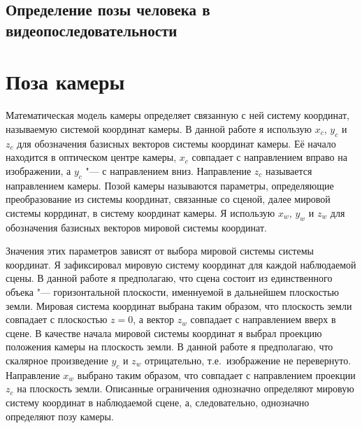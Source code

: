 \subsection{Определение позы человека в видеопоследовательности}

\def\slantfrac#1#2{ \hspace{3pt}\!^{#1}\!\!\hspace{1pt}/
	\hspace{2pt}\!\!_{#2}\!\hspace{3pt}
} %

\iffalse
\chapter{Определение позы камеры в сцене} \label{chapt1}
\fi

\section{Поза камеры}
Математическая модель камеры определяет связанную с ней систему координат, называемую системой координат камеры. В данной работе я использую $x_c$, $y_c$ и $z_c$ для обозначения базисных векторов системы координат камеры. Её начало находится в оптическом центре камеры, $x_c$ совпадает с направлением вправо на изображении, а $y_c$ "--- с направлением вниз. Направление $z_c$ называется направлением камеры. Позой камеры называются параметры, определяющие преобразование из системы координат, связанные со сценой, далее мировой системы коррдинат, в систему координат камеры. Я использую $x_w$, $y_w$ и $z_w$ для обозначения базисных векторов мировой системы координат.

Значения этих параметров зависят от выбора мировой системы системы координат. Я зафиксировал мировую систему координат для каждой наблюдаемой сцены. В данной работе я предполагаю, что сцена состоит из единственного объека "--- горизонтальной плоскости, именнуемой в дальнейшем плоскостью земли. Мировая система координат выбрана таким образом, что плоскость земли совпадает с плоскостью $z=0$, а вектор $z_w$ совпадает с направлением вверх в сцене. В качестве начала мировой системы координат я выбрал проекцию положения камеры на плоскость земли. В данной работе я предполагаю, что скалярное произведение $y_c$ и $z_w$ отрицательно, т.е.~изображение не перевернуто. Направление $x_w$ выбрано таким образом, что совпадает с направлением проекции $z_c$ на плоскость земли.  Описанные ограничения однозначно определяют мировую систему координат в наблюдаемой сцене, а, следовательно, однозначно определяют позу камеры.

